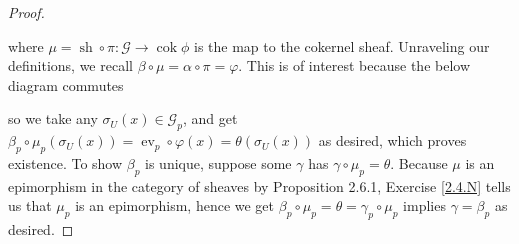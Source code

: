 \documentclass{article}
\newcommand{\fF}{\mathscr{F}}
\newcommand{\fG}{\mathscr{G}}
\DeclareMathOperator{\cok}{cok}
\DeclareMathOperator{\sh}{sh}
\DeclareMathOperator{\ev}{ev}
\begin{document}
\begin{proof}
    \begin{center}
    \end{center}
    where $\mu=\sh \circ \pi:\fG\to \cok \phi$ is the map to the cokernel sheaf. Unraveling our definitions, we recall $\beta \circ \mu = \alpha \circ \pi = \varphi$. This is of interest because the below diagram commutes
    \begin{center}
    \end{center}
    so we take any $\sigma_U(x)\in \fG_p$, and get $\beta_p\circ \mu_p (\sigma_U(x))= \ev_p \circ \varphi(x)=\theta( \sigma_U(x))$ as desired, which proves existence. To show $\beta_p$ is unique, suppose some $\gamma$ has $\gamma \circ \mu_p = \theta$. Because $\mu$ is an epimorphism in the category of sheaves by Proposition 2.6.1, Exercise \ref{2.4.N} tells us that $\mu_p$ is an epimorphism, hence we get $\beta_p \circ \mu_p = \theta = \gamma_p \circ \mu_p $ implies $\gamma = \beta_p$ as desired.
\end{proof}
\end{document}
